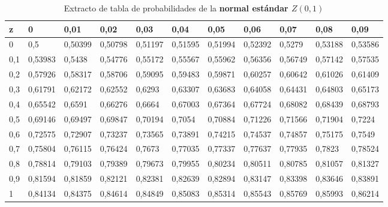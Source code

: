 \documentclass[addpoints,spanish, 12pt,a4paper]{exam}
\begin{document}
    
\begin{landscape}
\begin{table}[]
\Large
\centering
\caption{Extracto de tabla de probabilidades de la \textbf{normal estándar $Z(0,1)$}}
\label{my-label}

\begin{tabular}{l|llllllllll}
z   & 0       & 0,01    & 0,02    & 0,03    & 0,04    & 0,05    & 0,06    & 0,07    & 0,08    & 0,09    \\
\hline
0   & 0,5     & 0,50399 & 0,50798 & 0,51197 & 0,51595 & 0,51994 & 0,52392 & 0,5279  & 0,53188 & 0,53586 \\
0,1 & 0,53983 & 0,5438  & 0,54776 & 0,55172 & 0,55567 & 0,55962 & 0,56356 & 0,56749 & 0,57142 & 0,57535 \\
0,2 & 0,57926 & 0,58317 & 0,58706 & 0,59095 & 0,59483 & 0,59871 & 0,60257 & 0,60642 & 0,61026 & 0,61409 \\
0,3 & 0,61791 & 0,62172 & 0,62552 & 0,6293  & 0,63307 & 0,63683 & 0,64058 & 0,64431 & 0,64803 & 0,65173 \\
0,4 & 0,65542 & 0,6591  & 0,66276 & 0,6664  & 0,67003 & 0,67364 & 0,67724 & 0,68082 & 0,68439 & 0,68793 \\
0,5 & 0,69146 & 0,69497 & 0,69847 & 0,70194 & 0,7054  & 0,70884 & 0,71226 & 0,71566 & 0,71904 & 0,7224  \\
0,6 & 0,72575 & 0,72907 & 0,73237 & 0,73565 & 0,73891 & 0,74215 & 0,74537 & 0,74857 & 0,75175 & 0,7549  \\
0,7 & 0,75804 & 0,76115 & 0,76424 & 0,7673  & 0,77035 & 0,77337 & 0,77637 & 0,77935 & 0,7823  & 0,78524 \\
0,8 & 0,78814 & 0,79103 & 0,79389 & 0,79673 & 0,79955 & 0,80234 & 0,80511 & 0,80785 & 0,81057 & 0,81327 \\
0,9 & 0,81594 & 0,81859 & 0,82121 & 0,82381 & 0,82639 & 0,82894 & 0,83147 & 0,83398 & 0,83646 & 0,83891 \\
1   & 0,84134 & 0,84375 & 0,84614 & 0,84849 & 0,85083 & 0,85314 & 0,85543 & 0,85769 & 0,85993 & 0,86214 \\

\end{tabular}
\end{table}
\end{landscape}
\end{document}
